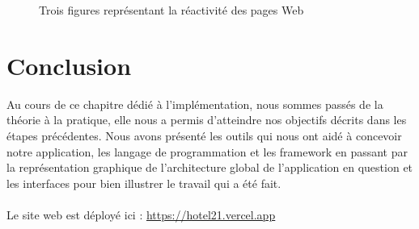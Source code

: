 \documentclass[12pt]{report}
\begin{document}
\begin{figure}[h]
\begin{minipage}{.33\textwidth}
\end{minipage}
\begin{minipage}{.32\textwidth}
\end{minipage}
  \caption{Trois figures représentant la réactivité des pages Web}
\end{figure}

\vspace*{-0.1in}
\section{Conclusion}
\vspace{0.1in}
\hspace*{0.16in}
Au cours de ce chapitre dédié à l’implémentation, nous sommes passés de la théorie à la pratique, elle nous a permis d’atteindre nos objectifs décrits dans les étapes précédentes. Nous avons présenté les outils qui nous ont aidé à concevoir notre application, les langage de programmation et les framework en passant par la représentation graphique de l’architecture global de l’application en question et les interfaces pour bien illustrer le travail qui a été fait.
\\\\
Le site web est déployé ici : \textcolor{blue}{\uline{\url{https://hotel21.vercel.app}}}

\newpage
\end{document}
